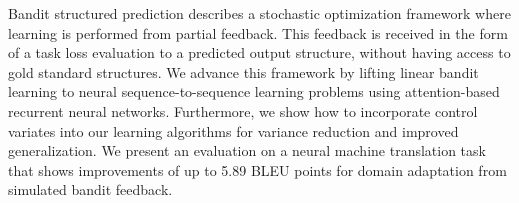 Bandit structured prediction describes a stochastic optimization framework where learning is performed from partial feedback. This feedback is received in the form of a task loss evaluation to a predicted output structure, without having access to gold standard structures. We advance this framework by lifting linear bandit learning to neural sequence-to-sequence learning problems using attention-based recurrent neural networks. Furthermore, we show how to incorporate control variates into our learning algorithms for variance reduction and improved generalization. We present an evaluation on a neural machine translation task that shows improvements of up to 5.89 BLEU points for domain adaptation from simulated bandit feedback.
